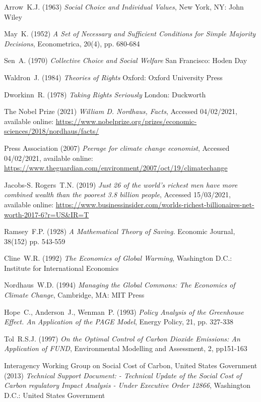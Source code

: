 \documentclass[11pt, oneside]{article}   	%
\begin{document}
\begin{thebibliography}{99}
 Arrow~K.J. (1963)
\emph{Social Choice and Individual Values},
New York, NY: John Wiley
	
 May~K. (1952)
\emph{A Set of Necessary and Sufficient Conditions for Simple Majority Decisions},
Econometrica, 20(4), pp. 680-684
	
 Sen~A. (1970)
\emph{Collective Choice and Social Welfare}
San Francisco: Hoden Day
	
 Waldron~J. (1984)
\emph{Theories of Rights}
Oxford: Oxford University Press
	
 Dworkinn~R. (1978)
\emph{Taking Rights Seriously}
London: Duckworth
	
 The Nobel Prize (2021)
\emph{William D. Nordhaus, Facts},
Accessed 04/02/2021, available online: 
\url{https://www.nobelprize.org/prizes/economic-sciences/2018/nordhaus/facts/}
	
 Press Association (2007)
\emph{Peerage for climate change economist},
Accessed 04/02/2021, available online: 
\url{https://www.theguardian.com/environment/2007/oct/19/climatechange}
	
 Jacobs-S. Rogers~T.N. (2019)
\emph{Just 26 of the world's richest men have more combined wealth than the poorest 3.8 billion people},
Accessed 15/03/2021, available online: 
\url{https://www.businessinsider.com/worlds-richest-billionaires-net-worth-2017-6?r=US&IR=T}
	
 Ramsey~F.P. (1928)
\emph{A Mathematical Theory of Saving.}
Economic Journal, 38(152) pp. 543-559
	
 Cline~W.R. (1992)
\emph{The Economics of Global Warming},
Washington D.C.: Institute for International Economics
	
 Nordhaus~W.D. (1994)
\emph{Managing the Global Commons: The Economics of Climate Change},
Cambridge, MA: MIT Press
	
 Hope~C., Anderson~J., Wenman~P. (1993)
\emph{Policy Analysis of the Greenhouse Effect. An Application of the PAGE Model},
Energy Policy, 21, pp. 327-338
	
 Tol~R.S.J. (1997)
\emph{On the Optimal Control of Carbon Dioxide Emissions: An Application of FUND},
Environmental Modelling and Assessment, 2, pp151-163
	
 Interagency Working Group on Social Cost of Carbon, United States Government (2013)
\emph{Technical Support Document: - Technical Update of the Social Cost of Carbon regulatory Impact Analysis - Under Executive Order 12866},
Washington D.C.: United States Government
	

\end{thebibliography}
\end{document}
